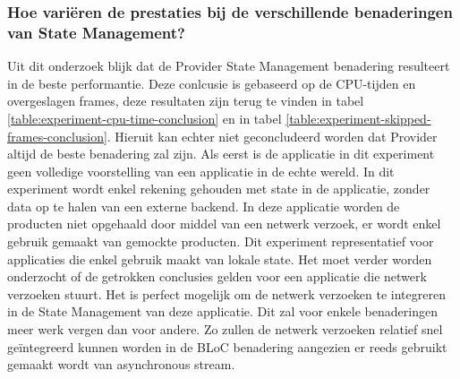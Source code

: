 \subsubsection{Hoe variëren de prestaties bij de verschillende benaderingen van State Management?}

Uit dit onderzoek blijk dat de Provider State Management benadering resulteert in de beste performantie. Deze conlcusie is gebaseerd op de CPU-tijden en overgeslagen frames, deze resultaten zijn terug te vinden in tabel \ref{table:experiment-cpu-time-conclusion} en in tabel \ref{table:experiment-skipped-frames-conclusion}. Hieruit kan echter niet geconcludeerd worden dat Provider altijd de beste benadering zal zijn. \newline \newline
Als eerst is de applicatie in dit experiment geen volledige voorstelling van een applicatie in de echte wereld. In dit experiment wordt enkel rekening gehouden met state in de applicatie, zonder data op te halen van een externe backend. In deze applicatie worden de producten niet opgehaald door middel van een netwerk verzoek, er wordt enkel gebruik gemaakt van gemockte producten. Dit experiment representatief voor applicaties die enkel gebruik maakt van lokale state. Het moet verder worden onderzocht of de getrokken conclusies gelden voor een applicatie die netwerk verzoeken stuurt. \newline
Het is perfect mogelijk om de netwerk verzoeken te integreren in de State Management van deze applicatie. Dit zal voor enkele benaderingen meer werk vergen dan voor andere. Zo zullen de netwerk verzoeken relatief snel geïntegreerd kunnen worden in de BLoC benadering aangezien er reeds gebruikt gemaakt wordt van asynchronous stream. \newline 

